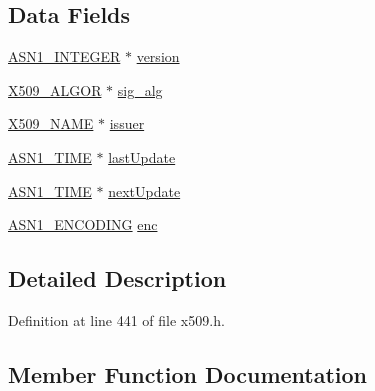 \subsection*{Data Fields}
\begin{DoxyCompactItemize}
\item 
\hyperlink{crypto_2ossl__typ_8h_af4335399bf9774cb410a5e93de65998b}{A\+S\+N1\+\_\+\+I\+N\+T\+E\+G\+ER} $\ast$ \hyperlink{struct_x509__crl__info__st_abf367aeef355b6acf5be7c569c4b28b0}{version}
\item 
\hyperlink{crypto_2ossl__typ_8h_aa2b6185e6254f36f709cd6577fb5022e}{X509\+\_\+\+A\+L\+G\+OR} $\ast$ \hyperlink{struct_x509__crl__info__st_a48635ef8176d7ad1ab56a1088f7321fb}{sig\+\_\+alg}
\item 
\hyperlink{crypto_2ossl__typ_8h_a5c5fc036757e87b9bd163d0221696533}{X509\+\_\+\+N\+A\+ME} $\ast$ \hyperlink{struct_x509__crl__info__st_a45017edc554e7984544678696c7a2e75}{issuer}
\item 
\hyperlink{crypto_2ossl__typ_8h_ad8d7393bc444b691d2b2c20d247b4e27}{A\+S\+N1\+\_\+\+T\+I\+ME} $\ast$ \hyperlink{struct_x509__crl__info__st_a0525036a9b3d81d5ad97bf5aaa001a62}{last\+Update}
\item 
\hyperlink{crypto_2ossl__typ_8h_ad8d7393bc444b691d2b2c20d247b4e27}{A\+S\+N1\+\_\+\+T\+I\+ME} $\ast$ \hyperlink{struct_x509__crl__info__st_a22fae8c5f603ba7fad887d5b70c915ba}{next\+Update}
\item 
\hyperlink{crypto_2asn1_2asn1_8h_ab4e998bfb21dbcf5af17f61035295946}{A\+S\+N1\+\_\+\+E\+N\+C\+O\+D\+I\+NG} \hyperlink{struct_x509__crl__info__st_a6d03127d2bcfc5727232717a5ba76f91}{enc}
\end{DoxyCompactItemize}


\subsection{Detailed Description}


Definition at line 441 of file x509.\+h.



\subsection{Member Function Documentation}
